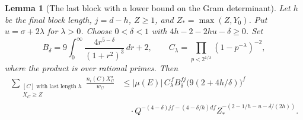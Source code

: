 \documentclass[a4paper,11pt]{article}
\newtheorem{lemma}[proposition]{Lemma}
\theoremstyle{definition}
\theoremstyle{remark}
\numberwithin{equation}{section}
\begin{document}
\begin{lemma}[The last block with a lower bound on the Gram determinant]
\leavevmode\label{lem:orientationtail613}
Let \(h\) be the final block length, \(j=d-h\), \(Z\ge1\), and
\(Z_*=\max(Z,Y_0)\). Put \(u=\sigma+2\lambda\) for \(\lambda>0\).
Choose \(0<\delta<1\) with \(4h-2-2hu-\delta\ge0\). Set
\[
 B_\delta=9\int_0^\infty
       \frac{4r^{5-\delta}}{(1+r^2)^3}\,dr+2,\qquad
 C_\lambda=\prod_{p<2^{1/\lambda}}(1-p^{-\lambda})^{-2},
\]
where the product is over rational primes. Then
\begin{align*}
 \sum_{\substack{[C]\text{ with last length }h\\ X_C\ge Z}}
       \frac{n_i(C)X_C^\sigma}{w_C}
 &\le |\mu(E)|\, C_\lambda^{\,f} B_\delta^{fj}
                  \bigl(9(2+4h/\delta)\bigr)^f\\[-2pt]
 &\quad{}\cdot Q^{-(4-\delta)jf-(4-\delta/h)df}
          Z_*^{-(2-1/h-u-\delta/(2h))}.
\end{align*}
\end{lemma}
\end{document}
